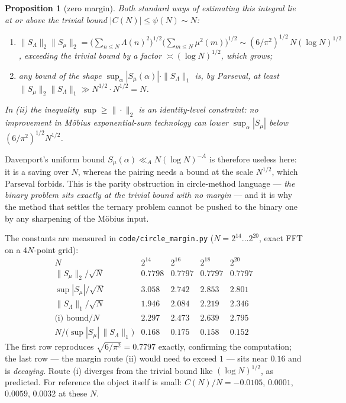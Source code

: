 \documentclass[11pt,a4paper]{article}
\theoremstyle{plain}
\newtheorem{proposition}[theorem]{Proposition}
\theoremstyle{definition}
\begin{document}
\begin{proposition}[zero margin]\label{prop:E}
Both standard ways of estimating this integral lie at or above the
trivial bound $|C(N)|\le\psi(N)\sim N$:
\begin{enumerate}
\item[(i)] $\|S_\Lambda\|_2\|S_\mu\|_2
   = \bigl(\sum_{n\le N}\Lambda(n)^2\bigr)^{1/2}
     \bigl(\sum_{m\le N}\mu^2(m)\bigr)^{1/2}
   \sim (6/\pi^2)^{1/2}\,N(\log N)^{1/2}$, exceeding the trivial bound
   by a factor $\asymp(\log N)^{1/2}$, which \emph{grows};
\item[(ii)] any bound of the shape
  $\sup_\alpha|S_\mu(\alpha)|\cdot\|S_\Lambda\|_1$ is, by Parseval,
  at least $\|S_\mu\|_2\|S_\Lambda\|_1 \gg N^{1/2}\cdot N^{1/2}=N$.
\end{enumerate}
In (ii) the inequality $\sup \ge \|\cdot\|_2$ is an identity-level
constraint: no improvement in M\"obius exponential-sum technology can
lower $\sup_\alpha|S_\mu|$ below $(6/\pi^2)^{1/2}N^{1/2}$.
\end{proposition}

Davenport's uniform bound $S_\mu(\alpha)\ll_A N(\log N)^{-A}$ is
therefore useless here: it is a saving over $N$, whereas the pairing
needs a bound at the scale $N^{1/2}$, which Parseval forbids. This is
the parity obstruction in circle-method language --- \emph{the binary
problem sits exactly at the trivial bound with no margin} --- and it is
why the method that settles the ternary problem cannot be pushed to
the binary one by any sharpening of the M\"obius input.

The constants are measured in \texttt{code/circle\_margin.py}
($N=2^{14}\ldots2^{20}$, exact FFT on a $4N$-point grid):
\[
\begin{array}{r|cccc}
 N & 2^{14} & 2^{16} & 2^{18} & 2^{20}\\\hline
 \|S_\mu\|_2/\sqrt N & 0.7798 & 0.7797 & 0.7797 & 0.7797\\
 \sup|S_\mu|/\sqrt N & 3.058 & 2.742 & 2.853 & 2.801\\
 \|S_\Lambda\|_1/\sqrt N & 1.946 & 2.084 & 2.219 & 2.346\\
 \text{(i) bound}/N & 2.297 & 2.473 & 2.639 & 2.795\\
 N/\bigl(\sup|S_\mu|\,\|S_\Lambda\|_1\bigr) & 0.168 & 0.175 & 0.158
  & 0.152
\end{array}
\]
The first row reproduces $\sqrt{6/\pi^2}=0.7797$ exactly, confirming
the computation; the last row --- the margin route (ii) would need to
exceed $1$ --- sits near $0.16$ and is \emph{decaying}. Route (i)
diverges from the trivial bound like $(\log N)^{1/2}$, as predicted.
For reference the object itself is small: $C(N)/N = -0.0105$, $0.0001$,
$0.0059$, $0.0032$ at these $N$.
\end{document}
